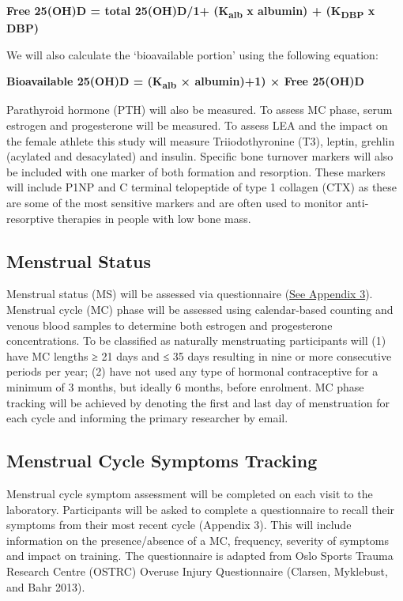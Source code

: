 \documentclass[
]{article}
\begin{document}
\textbf{Free 25(OH)D = total 25(OH)D/1+ (K\textsubscript{alb} x albumin) + (K\textsubscript{DBP} x DBP)}

We will also calculate the `bioavailable portion' using the following equation:

\textbf{Bioavailable 25(OH)D = (K\textsubscript{alb} × albumin)+1) × Free 25(OH)D}

Parathyroid hormone (PTH) will also be measured. To assess MC phase, serum estrogen and progesterone will be measured. To assess LEA and the impact on the female athlete this study will measure Triiodothyronine (T3), leptin, grehlin (acylated and desacylated) and insulin. Specific bone turnover markers will also be included with one marker of both formation and resorption. These markers will include P1NP and C terminal telopeptide of type 1 collagen (CTX) as these are some of the most sensitive markers and are often used to monitor anti-resorptive therapies in people with low bone mass.

\subsection{Menstrual Status}\label{menstrual-status}

Menstrual status (MS) will be assessed via questionnaire (\hyperref[appendix-menstrualq]{See Appendix 3}). Menstrual cycle (MC) phase will be assessed using calendar-based counting and venous blood samples to determine both estrogen and progesterone concentrations. To be classified as naturally menstruating participants will (1) have MC lengths ≥ 21 days and ≤ 35 days resulting in nine or more consecutive periods per year; (2) have not used any type of hormonal contraceptive for a minimum of 3 months, but ideally 6 months, before enrolment. MC phase tracking will be achieved by denoting the first and last day of menstruation for each cycle and informing the primary researcher by email.

\subsection{Menstrual Cycle Symptoms Tracking}\label{menstrual-cycle-symptoms-tracking}

Menstrual cycle symptom assessment will be completed on each visit to the laboratory. Participants will be asked to complete a questionnaire to recall their symptoms from their most recent cycle (Appendix 3). This will include information on the presence/absence of a MC, frequency, severity of symptoms and impact on training. The questionnaire is adapted from Oslo Sports Trauma Research Centre (OSTRC) Overuse Injury Questionnaire (Clarsen, Myklebust, and Bahr 2013).
\end{document}
